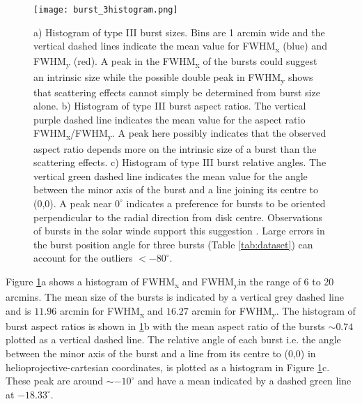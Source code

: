 \begin{figure}[ht]
\centering
\texttt{[image: burst\_3histogram.png]}
\caption[Histograms of type III burst sizes, aspect ratios and relative angles.]{a) Histogram of type III burst sizes. Bins are 1 arcmin wide and the vertical dashed lines indicate the mean value for FWHM\textsubscript{x} (blue) and FWHM\textsubscript{y} (red). A peak in the FWHM\textsubscript{x} of the bursts could suggest an intrinsic size while the possible double peak in FWHM\textsubscript{y} shows that scattering effects cannot simply be determined from burst size alone. b) Histogram of type III burst aspect ratios. The vertical purple dashed line indicates the mean value for the aspect ratio FWHM\textsubscript{x}/FWHM\textsubscript{y}. A peak here possibly indicates that the observed aspect ratio depends more on the intrinsic size of a burst than the scattering effects. c) Histogram of type III burst relative angles. The vertical green dashed line indicates the mean value for the angle between the minor axis of the burst and a line joining its centre to (0,0). A peak near $0^\circ$ indicates a preference for bursts to be oriented perpendicular to the radial direction from disk centre. Observations of bursts in the solar winde support this suggestion \citep{Anantharamaiah1994,SasikumarRaja2016}. Large errors in the burst position angle for three bursts (Table \ref{tab:dataset}) can account for the outliers $< -80^\circ$.}
\label{fig:burst_hist}
\end{figure}

Figure \ref{fig:burst_hist}a shows a histogram of FWHM\textsubscript{x} and FWHM\textsubscript{y}in the range of 6 to 20 arcmins. The mean size of the bursts is indicated by a vertical grey dashed line and is $11.96$ arcmin for FWHM\textsubscript{x} and $16.27$ arcmin for FWHM\textsubscript{y}. The histogram of burst aspect ratios is shown in \ref{fig:burst_hist}b with the mean aspect ratio of the bursts $\sim 0.74$ plotted as a vertical dashed line. 
The relative angle of each burst i.e. the angle between the minor axis of the burst and a line from its centre to (0,0) in helioprojective-cartesian coordinates, is plotted as a histogram in Figure \ref{fig:burst_hist}c. These peak are around $\sim -10^\circ$ and have a mean indicated by a dashed green line at $-18.33^\circ$.

